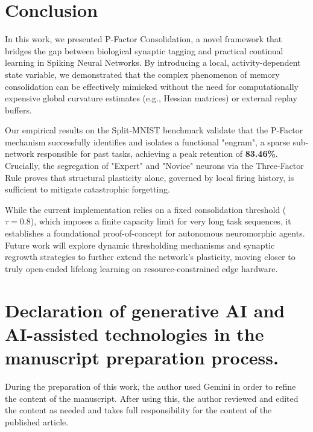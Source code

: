 \documentclass[5p,times]{elsarticle}
\begin{document}
\section{Conclusion}
In this work, we presented P-Factor Consolidation, a novel framework that bridges the gap between biological synaptic tagging and practical continual learning in Spiking Neural Networks. By introducing a local, activity-dependent state variable, we demonstrated that the complex phenomenon of memory consolidation can be effectively mimicked without the need for computationally expensive global curvature estimates (e.g., Hessian matrices) or external replay buffers.

Our empirical results on the Split-MNIST benchmark validate that the P-Factor mechanism successfully identifies and isolates a functional "engram", a sparse sub-network responsible for past tasks, achieving a peak retention of \textbf{83.46\%}. Crucially, the segregation of "Expert" and "Novice" neurons via the Three-Factor Rule proves that structural plasticity alone, governed by local firing history, is sufficient to mitigate catastrophic forgetting.

While the current implementation relies on a fixed consolidation threshold ($\tau=0.8$), which imposes a finite capacity limit for very long task sequences, it establishes a foundational proof-of-concept for autonomous neuromorphic agents. Future work will explore dynamic thresholding mechanisms and synaptic regrowth strategies to further extend the network's plasticity, moving closer to truly open-ended lifelong learning on resource-constrained edge hardware.

\section*{Declaration of generative AI and AI-assisted technologies in the manuscript preparation process.}
During the preparation of this work, the author used Gemini in order to refine the content of the manuscript. After using this, the author reviewed and edited the content as needed and takes full responsibility for the content of the published article.
\end{document}
